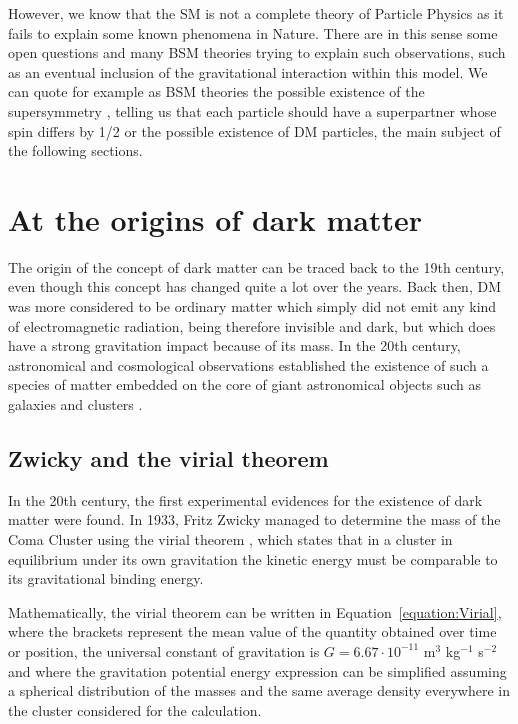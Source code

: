 \documentclass[a4paper, 10pt, openright]{report}
\begin{document}
However, we know that the \ac{SM} is not a complete theory of Particle Physics as it fails to explain some known phenomena in Nature. There are in this sense some open questions and many \ac{BSM} theories trying to explain such observations, such as an eventual inclusion of the gravitational interaction within this model. We can quote for example as \ac{BSM} theories the possible existence of the supersymmetry \cite{SUSY}, telling us that each particle should have a superpartner whose spin differs by 1/2 or the possible existence of \ac{DM} particles, the main subject of the following sections.

\section{At the origins of dark matter} \label{section:DMOrigins}

The origin of the concept of dark matter can be traced back to the 19th century, even though this concept has changed quite a lot over the years. Back then, \ac{DM} was more considered to be ordinary matter which simply did not emit any kind of electromagnetic radiation, being therefore invisible and dark, but which does have a strong gravitation impact because of its mass. In the 20th century, astronomical and cosmological observations established the existence of such a species of matter embedded on the core of giant astronomical objects such as galaxies and clusters \cite{Poincare}.

\subsection{Zwicky and the virial theorem}

In the 20th century, the first experimental evidences for the existence of dark matter were found. In 1933, Fritz Zwicky managed to determine the mass of the Coma Cluster using the virial theorem \cite{Zwicky}, which states that in a cluster in equilibrium under its own gravitation the kinetic energy must be comparable to its gravitational binding energy. 

Mathematically, the virial theorem can be written in Equation~\ref{equation:Virial}, where the brackets represent the mean value of the quantity obtained over time or position, the universal constant of gravitation is $G = 6.67 \cdot 10^{-11}$ m$^3$ kg$^{-1}$ s$^{-2}$ and where the gravitation potential energy expression can be simplified assuming a spherical distribution of the masses and the same average density everywhere in the cluster considered for the calculation.
\end{document}
